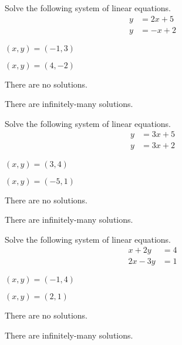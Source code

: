 \begin{readinessAssuranceTest}
\item Solve the following system of linear equations.
      \begin{align*}
      y   &=   2x+5 \\
      y  &=  -x+2
      \end{align*}

\begin{multicols}{4}
\begin{readinessAssuranceTestChoices}
\item \((x,y)=(-1,3)\) %
\item \((x,y)=(4,-2)\)
\item There are no solutions.
\item There are infinitely-many solutions.
\end{readinessAssuranceTestChoices}
\end{multicols}

\item Solve the following system of linear equations.
      \begin{align*}
      y   &=  3x+5 \\
      y  &=  3x+2
      \end{align*}

\begin{multicols}{4}
\begin{readinessAssuranceTestChoices}
\item
\((x,y)=(3,4)\)
\item
\((x,y)=(-5,1)\)
\item There are no solutions. %
\item There are infinitely-many solutions.
\end{readinessAssuranceTestChoices}
\end{multicols}

\item Solve the following system of linear equations.
      \begin{align*}
      x+2y   &=   4 \\
      2x-3y  &=  1
      \end{align*}

\begin{multicols}{4}
\begin{readinessAssuranceTestChoices}
\item
\((x,y)=(-1,4)\)
\item
\((x,y)=(2,1)\) %
\item There are no solutions.
\item There are infinitely-many solutions.
\end{readinessAssuranceTestChoices}
\end{multicols}


\end{readinessAssuranceTest}
